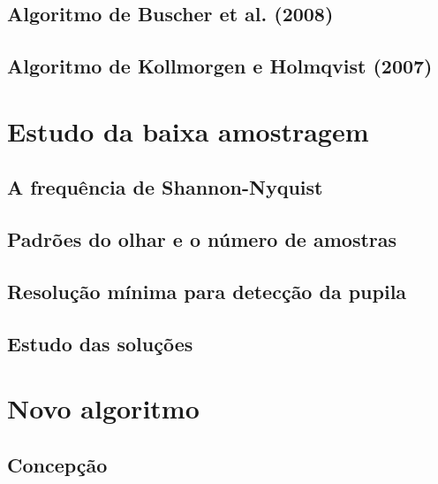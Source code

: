 \documentclass[12pt]{article}
\begin{document}
		\subsection{Algoritmo de Buscher et al. (2008)}
		
		\subsection{Algoritmo de Kollmorgen e Holmqvist (2007)}
		
	\section{Estudo da baixa amostragem}
		
		\subsection{A frequência de Shannon-Nyquist}
		
		\subsection{Padrões do olhar e o número de amostras}
		
		\subsection{Resolução mínima para detecção da pupila}
		
		\subsection{Estudo das soluções}
	
	\section{Novo algoritmo}
		
		\subsection{Concepção}
		
\end{document}
